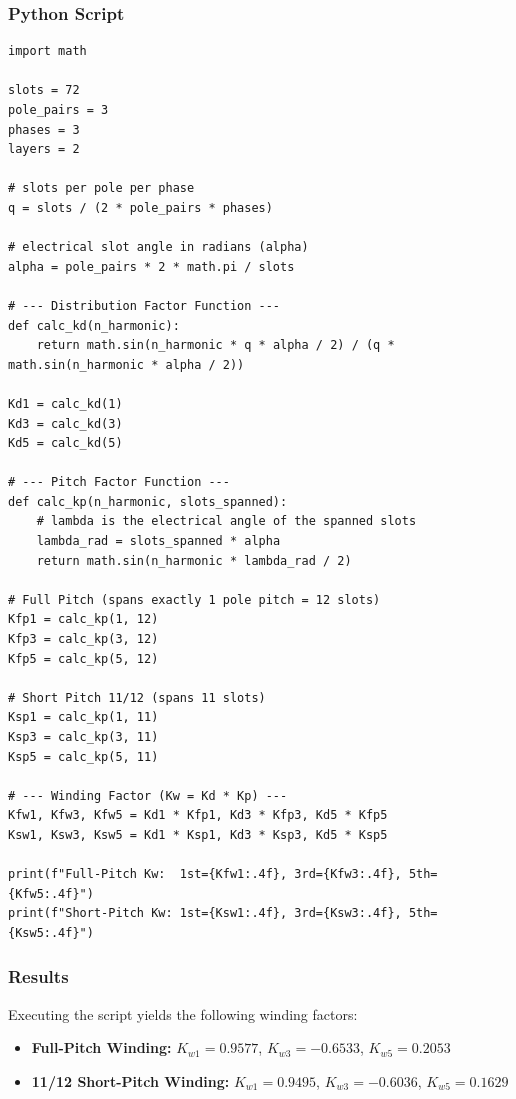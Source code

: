 \documentclass{article}
\begin{document}
\subsubsection*{Python Script}
\begin{lstlisting}
import math

slots = 72
pole_pairs = 3
phases = 3
layers = 2

# slots per pole per phase
q = slots / (2 * pole_pairs * phases)

# electrical slot angle in radians (alpha)
alpha = pole_pairs * 2 * math.pi / slots

# --- Distribution Factor Function ---
def calc_kd(n_harmonic):
    return math.sin(n_harmonic * q * alpha / 2) / (q * math.sin(n_harmonic * alpha / 2))

Kd1 = calc_kd(1)
Kd3 = calc_kd(3)
Kd5 = calc_kd(5)

# --- Pitch Factor Function ---
def calc_kp(n_harmonic, slots_spanned):
    # lambda is the electrical angle of the spanned slots
    lambda_rad = slots_spanned * alpha
    return math.sin(n_harmonic * lambda_rad / 2)

# Full Pitch (spans exactly 1 pole pitch = 12 slots)
Kfp1 = calc_kp(1, 12)
Kfp3 = calc_kp(3, 12)
Kfp5 = calc_kp(5, 12)

# Short Pitch 11/12 (spans 11 slots)
Ksp1 = calc_kp(1, 11)
Ksp3 = calc_kp(3, 11)
Ksp5 = calc_kp(5, 11)

# --- Winding Factor (Kw = Kd * Kp) ---
Kfw1, Kfw3, Kfw5 = Kd1 * Kfp1, Kd3 * Kfp3, Kd5 * Kfp5
Ksw1, Ksw3, Ksw5 = Kd1 * Ksp1, Kd3 * Ksp3, Kd5 * Ksp5

print(f"Full-Pitch Kw:  1st={Kfw1:.4f}, 3rd={Kfw3:.4f}, 5th={Kfw5:.4f}")
print(f"Short-Pitch Kw: 1st={Ksw1:.4f}, 3rd={Ksw3:.4f}, 5th={Ksw5:.4f}")
\end{lstlisting}

\subsubsection*{Results}
Executing the script yields the following winding factors:
\begin{itemize}
    \item \textbf{Full-Pitch Winding:} $K_{w1} = \mathbf{0.9577}$, $K_{w3} = \mathbf{-0.6533}$, $K_{w5} = \mathbf{0.2053}$
    \item \textbf{11/12 Short-Pitch Winding:} $K_{w1} = \mathbf{0.9495}$, $K_{w3} = \mathbf{-0.6036}$, $K_{w5} = \mathbf{0.1629}$
\end{itemize}
\end{document}
